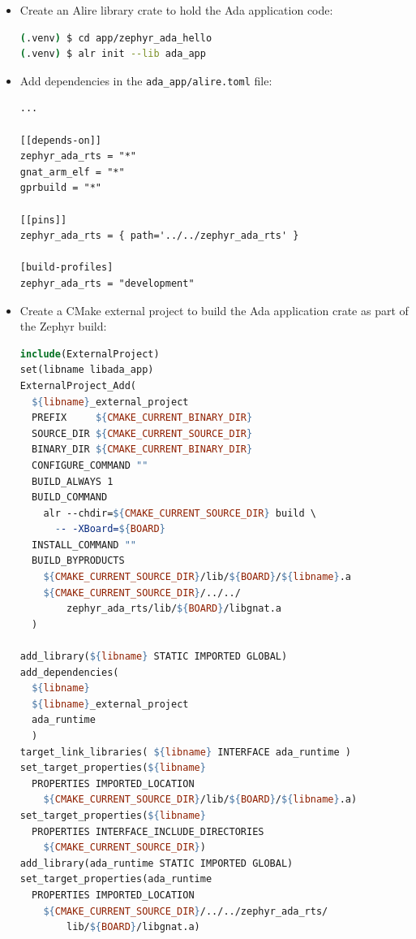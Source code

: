 \documentclass{AUJarticle}
\begin{document}
\begin{itemize}
\item Create an Alire library crate to hold the Ada application code:
\begin{lstlisting}[language=bash, basicstyle=\ttfamily\scriptsize]
(.venv) $ cd app/zephyr_ada_hello
(.venv) $ alr init --lib ada_app
\end{lstlisting}

\item Add dependencies in the \verb`ada_app/alire.toml` file:

\begin{lstlisting}[basicstyle=\ttfamily\scriptsize]
...

[[depends-on]]
zephyr_ada_rts = "*"
gnat_arm_elf = "*"
gprbuild = "*"

[[pins]]
zephyr_ada_rts = { path='../../zephyr_ada_rts' }

[build-profiles]
zephyr_ada_rts = "development"
\end{lstlisting}

\item Create a CMake external project to build the Ada application crate as part of the
Zephyr build:

\begin{lstlisting}[language=make, basicstyle=\ttfamily\scriptsize]
include(ExternalProject)
set(libname libada_app)
ExternalProject_Add(
  ${libname}_external_project
  PREFIX     ${CMAKE_CURRENT_BINARY_DIR}
  SOURCE_DIR ${CMAKE_CURRENT_SOURCE_DIR}
  BINARY_DIR ${CMAKE_CURRENT_BINARY_DIR}
  CONFIGURE_COMMAND ""
  BUILD_ALWAYS 1
  BUILD_COMMAND
    alr --chdir=${CMAKE_CURRENT_SOURCE_DIR} build \
      -- -XBoard=${BOARD}
  INSTALL_COMMAND ""
  BUILD_BYPRODUCTS
    ${CMAKE_CURRENT_SOURCE_DIR}/lib/${BOARD}/${libname}.a
    ${CMAKE_CURRENT_SOURCE_DIR}/../../
        zephyr_ada_rts/lib/${BOARD}/libgnat.a
  )

add_library(${libname} STATIC IMPORTED GLOBAL)
add_dependencies(
  ${libname}
  ${libname}_external_project
  ada_runtime
  )
target_link_libraries( ${libname} INTERFACE ada_runtime )
set_target_properties(${libname}
  PROPERTIES IMPORTED_LOCATION
    ${CMAKE_CURRENT_SOURCE_DIR}/lib/${BOARD}/${libname}.a)
set_target_properties(${libname}
  PROPERTIES INTERFACE_INCLUDE_DIRECTORIES
    ${CMAKE_CURRENT_SOURCE_DIR})
add_library(ada_runtime STATIC IMPORTED GLOBAL)
set_target_properties(ada_runtime
  PROPERTIES IMPORTED_LOCATION
    ${CMAKE_CURRENT_SOURCE_DIR}/../../zephyr_ada_rts/
        lib/${BOARD}/libgnat.a)
\end{lstlisting}


\end{itemize}
\end{document}
